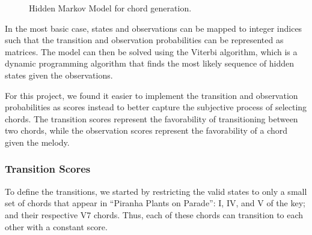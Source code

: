 \begin{figure}
    \centering
    \caption{Hidden Markov Model for chord generation.}
    \label{fig:hmm}
\end{figure}

In the most basic case, states and observations can be mapped to integer indices such that the transition and observation probabilities can be represented as matrices. The model can then be solved using the Viterbi algorithm, which is a dynamic programming algorithm that finds the most likely sequence of hidden states given the observations.

For this project, we found it easier to implement the transition and observation probabilities as scores instead to better capture the subjective process of selecting chords. The transition scores represent the favorability of transitioning between two chords, while the observation scores represent the favorability of a chord given the melody.

\subsubsection{Transition Scores}

To define the transitions, we started by restricting the valid states to only a small set of chords that appear in ``Piranha Plants on Parade'': I, IV, and V of the key; and their respective V7 chords. Thus, each of these chords can transition to each other with a constant score.

